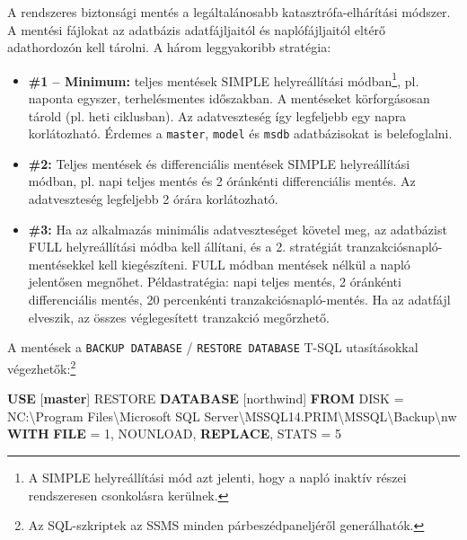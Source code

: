\documentclass[
  magyar,
]{article}
\newenvironment{Shaded}{}{}
\newcommand{\CharTok}[1]{\textcolor[rgb]{0.25,0.44,0.63}{#1}}
\newcommand{\DecValTok}[1]{\textcolor[rgb]{0.25,0.63,0.44}{#1}}
\newcommand{\KeywordTok}[1]{\textcolor[rgb]{0.00,0.44,0.13}{\textbf{#1}}}
\newcommand{\NormalTok}[1]{#1}
\newcommand{\OperatorTok}[1]{\textcolor[rgb]{0.40,0.40,0.40}{#1}}
\newcommand{\StringTok}[1]{\textcolor[rgb]{0.25,0.44,0.63}{#1}}
\providecommand{\tightlist}{%
  \setlength{\itemsep}{0pt}\setlength{\parskip}{0pt}}
\begin{document}
A rendszeres biztonsági mentés a legáltalánosabb katasztrófa-elhárítási
módszer. A mentési fájlokat az adatbázis adatfájljaitól és
naplófájljaitól eltérő adathordozón kell tárolni. A három leggyakoribb
stratégia:

\begin{itemize}
\tightlist
\item
  \textbf{\#1 -- Minimum:} teljes mentések SIMPLE helyreállítási
  módban\footnote{A SIMPLE helyreállítási mód azt jelenti, hogy a napló
    inaktív részei rendszeresen csonkolásra kerülnek.}, pl. naponta
  egyszer, terhelésmentes időszakban. A mentéseket körforgásosan tárold
  (pl. heti ciklusban). Az adatveszteség így legfeljebb egy napra
  korlátozható. Érdemes a \texttt{master}, \texttt{model} és
  \texttt{msdb} adatbázisokat is belefoglalni.
\item
  \textbf{\#2:} Teljes mentések és differenciális mentések SIMPLE
  helyreállítási módban, pl. napi teljes mentés és 2 óránkénti
  differenciális mentés. Az adatveszteség legfeljebb 2 órára
  korlátozható.
\item
  \textbf{\#3:} Ha az alkalmazás minimális adatveszteséget követel meg,
  az adatbázist FULL helyreállítási módba kell állítani, és a 2.
  stratégiát tranzakciósnapló-mentésekkel kell kiegészíteni. FULL módban
  mentések nélkül a napló jelentősen megnőhet. Példastratégia: napi
  teljes mentés, 2 óránkénti differenciális mentés, 20 percenkénti
  tranzakciósnapló-mentés. Ha az adatfájl elveszik, az összes
  véglegesített tranzakció megőrzhető.
\end{itemize}

A mentések a \texttt{BACKUP\ DATABASE} / \texttt{RESTORE\ DATABASE}
T-SQL utasításokkal végezhetők:\footnote{Az SQL-szkriptek az SSMS minden
  párbeszédpaneljéről generálhatók.}

\begin{Shaded}
\begin{Highlighting}[]
\KeywordTok{USE}\NormalTok{ [}\KeywordTok{master}\NormalTok{]}
\NormalTok{RESTORE }\KeywordTok{DATABASE}\NormalTok{ [northwind] }\KeywordTok{FROM}\NormalTok{ DISK }\OperatorTok{=}\NormalTok{ N}\StringTok{\textquotesingle{}C:\textbackslash{}Program Files\textbackslash{}Microsoft SQL}
\StringTok{Server\textbackslash{}MSSQL14.PRIM\textbackslash{}MSSQL\textbackslash{}Backup}\CharTok{\textbackslash{}n}\StringTok{w\textquotesingle{}} \KeywordTok{WITH} \KeywordTok{FILE} \OperatorTok{=} \DecValTok{1}\NormalTok{, NOUNLOAD, }\KeywordTok{REPLACE}\NormalTok{, STATS }\OperatorTok{=} \DecValTok{5}
\end{Highlighting}
\end{Shaded}
\end{document}
